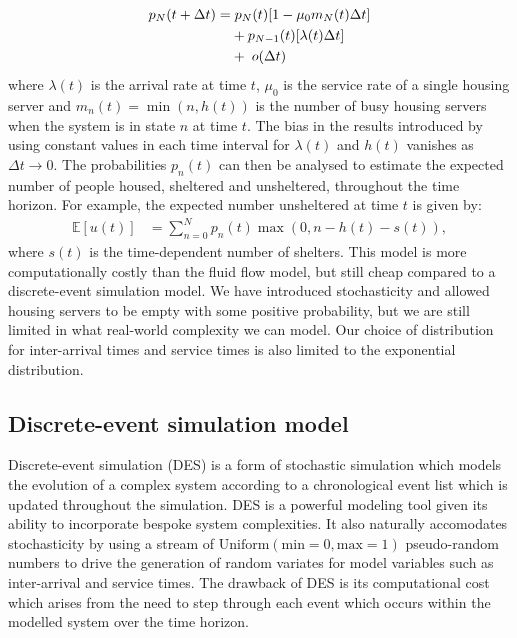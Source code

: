 \documentclass[12pt,a4paper]{article}
\begin{document}
% 
\begin{align*}
  p_N(t+\Delta t) = & \hspace{0.1cm} p_{N}(t)[1-\mu_0 m_N(t) \Delta t] \\
                    & + p_{N-1}(t)[\lambda(t) \Delta t] \\
                    & + \hspace{0.1cm} o(\Delta t)
\end{align*}
% 
where $\lambda(t)$ is the arrival rate at time $t$, $\mu_0$ is the service rate of a single housing server and $m_n(t) = \min(n,h(t))$ is the number of busy housing servers when the system is in state $n$ at time $t$. The bias in the results introduced by using constant values in each time interval for $\lambda(t)$ and $h(t)$ vanishes as $\Delta t \to 0$. The probabilities $p_n(t)$ can then be analysed to estimate the expected number of people housed, sheltered and unsheltered, throughout the time horizon. For example, the expected number unsheltered at time $t$ is given by:
%
\begin{align} \label{u_t_mmt}
\mathbb{E}[u(t)] & = \sum_{n=0}^{N} p_n(t) \max(0,n-h(t)-s(t)), 
\end{align}
%
where $s(t)$ is the time-dependent number of shelters. This model is more computationally costly than the fluid flow model, but still cheap compared to a discrete-event simulation model. We have introduced stochasticity and allowed housing servers to be empty with some positive probability, but we are still limited in what real-world complexity we can model. Our choice of distribution for inter-arrival times and service times is also limited to the exponential distribution. 
%
\subsection{Discrete-event simulation model} \label{DES}
%
Discrete-event simulation (DES) is a form of stochastic simulation which models the evolution of a complex system according to a chronological event list which is updated throughout the simulation. DES is a powerful modeling tool given its ability to incorporate bespoke system complexities. It also naturally accomodates stochasticity by using a stream of $\text{Uniform}(\text{min} = 0, \text{max} = 1)$ pseudo-random numbers to drive the generation of random variates for model variables such as inter-arrival and service times. The drawback of DES is its computational cost which arises from the need to step through each event which occurs within the modelled system over the time horizon.
\end{document}
